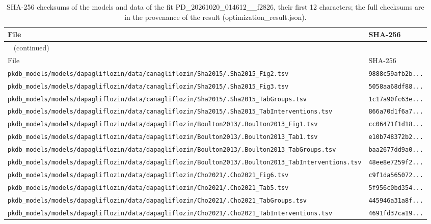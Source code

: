 \documentclass{article}
\begin{document}
\begin{longtable}{ll}
\caption{SHA-256 checksums of the models and data of the fit PD\_20261020\_014612\_\_f2826, their first 12 characters; the full checksums are in the provenance of the result (optimization\_result.json).}\label{tab:checksums:PD_20261020_014612__f2826} \\
\toprule
File & SHA-256 \\
\midrule
\endfirsthead
\multicolumn{2}{l}{\small\tablename~\thetable{} (continued)} \\
\toprule
File & SHA-256 \\
\midrule
\endhead
\bottomrule
\endlastfoot
\texttt{pkdb\_models/models/dapagliflozin/data/canagliflozin/Sha2015/.Sha2015\_Fig2.tsv} & \texttt{9888c59afb2b...} \\
\texttt{pkdb\_models/models/dapagliflozin/data/canagliflozin/Sha2015/.Sha2015\_Fig3.tsv} & \texttt{5058aa68df88...} \\
\texttt{pkdb\_models/models/dapagliflozin/data/canagliflozin/Sha2015/.Sha2015\_TabGroups.tsv} & \texttt{1c17a90fc63e...} \\
\texttt{pkdb\_models/models/dapagliflozin/data/canagliflozin/Sha2015/.Sha2015\_TabInterventions.tsv} & \texttt{866a70d1f6a7...} \\
\texttt{pkdb\_models/models/dapagliflozin/data/dapagliflozin/Boulton2013/.Boulton2013\_Fig1.tsv} & \texttt{cc06471f1d18...} \\
\texttt{pkdb\_models/models/dapagliflozin/data/dapagliflozin/Boulton2013/.Boulton2013\_Tab1.tsv} & \texttt{e10b748372b2...} \\
\texttt{pkdb\_models/models/dapagliflozin/data/dapagliflozin/Boulton2013/.Boulton2013\_TabGroups.tsv} & \texttt{baa2677dd9a0...} \\
\texttt{pkdb\_models/models/dapagliflozin/data/dapagliflozin/Boulton2013/.Boulton2013\_TabInterventions.tsv} & \texttt{48ee8e7259f2...} \\
\texttt{pkdb\_models/models/dapagliflozin/data/dapagliflozin/Cho2021/.Cho2021\_Fig6.tsv} & \texttt{c9f1da565072...} \\
\texttt{pkdb\_models/models/dapagliflozin/data/dapagliflozin/Cho2021/.Cho2021\_Tab5.tsv} & \texttt{5f956c0bd354...} \\
\texttt{pkdb\_models/models/dapagliflozin/data/dapagliflozin/Cho2021/.Cho2021\_TabGroups.tsv} & \texttt{445946a31a8f...} \\
\texttt{pkdb\_models/models/dapagliflozin/data/dapagliflozin/Cho2021/.Cho2021\_TabInterventions.tsv} & \texttt{4691fd37ca19...} \\

\end{longtable}
\end{document}
